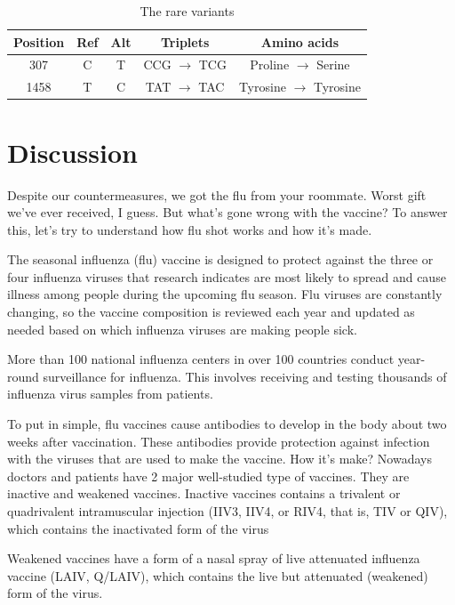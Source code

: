 \documentclass{article}
\begin{document}
\begin{table}
	\centering
	\begin{tabular}{|c|c|c|c|c|}
		\hline
		Position & Ref  & Alt & Triplets & Amino acids\\
		\hline
		307  & C & T & CCG  $\rightarrow$  TCG &  Proline $\rightarrow$ Serine \\
		\hline
		1458  & T & C & TAT $\rightarrow$   TAC &  Tyrosine $\rightarrow$ Tyrosine  \\
	 
		\hline
	\end{tabular}
	\caption{ The rare variants   }
	\label{tab:rarevars}
\end{table}

\section{Discussion}

Despite our countermeasures, we got the flu from your roommate. Worst gift we've ever received, I guess.
But what's gone wrong with the vaccine? To answer this, let's try to understand how flu shot works and how it's made.

The seasonal influenza (flu) vaccine is designed to protect against the three or four influenza viruses that research indicates are most likely to spread and cause illness among people during the upcoming flu season. Flu viruses are constantly changing, so the vaccine composition is reviewed each year and updated as needed based on which influenza viruses are making people sick.

More than 100 national influenza centers in over 100 countries conduct year-round surveillance for influenza. This involves receiving and testing thousands of influenza virus samples from patients.

To put in simple, flu vaccines cause antibodies to develop in the body about two weeks after vaccination. These antibodies provide protection against infection with the viruses that are used to make the vaccine. How it's make?
Nowadays doctors and patients have 2 major well-studied type of vaccines. They are inactive and weakened vaccines.
Inactive vaccines contains a trivalent or quadrivalent intramuscular injection (IIV3, IIV4, or RIV4, that is, TIV or QIV), which contains the inactivated form of the virus

Weakened vaccines have a form of a nasal spray of live attenuated influenza vaccine (LAIV, Q/LAIV), which contains the live but attenuated (weakened) form of the virus.
\end{document}
